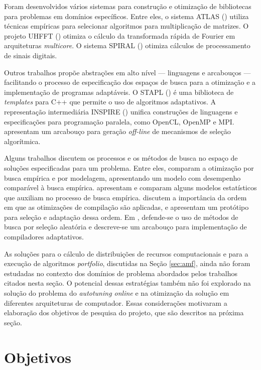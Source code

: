 \documentclass[a4paper, 11pt]{article}
\begin{document}
Foram desenvolvidos vários sistemas para construção e otimização de bibliotecas
para problemas em domínios específicos. Entre eles, o sistema ATLAS 
(\citet{whaley1998, whaley2005}) utiliza técnicas empíricas para selecionar
algoritmos para multiplicação de matrizes. O projeto UHFFT 
(\citet{ali2007scheduling}) otimiza o cálculo da transformada rápida
de Fourier em arquiteturas \emph{multicore}. O sistema SPIRAL 
(\citet{puschel2005spiral}) otimiza cálculos de processamento de sinais
digitais.

Outros trabalhos propõe abstrações em alto nível --- linguagens e arcabouços 
--- facilitando o processo de especificação dos espaços de busca para a 
otimização e a implementação de programas adaptáveis. O STAPL 
(\citet{thomas2005stapl}) é uma biblioteca de \emph{templates} para C++
que permite o uso de algoritmos adaptativos. A representação intermediária
INSPIRE (\citet{jordan2013inspire}) unifica construções de linguagens e 
especificações para programação paralela, como OpenCL, OpenMP e MPI.
\citet{yu2004adaptive} apresentam um arcabouço para geração \emph{off-line}
de mecanismos de seleção algorítmica.

Alguns trabalhos discutem os processos e os métodos de busca no espaço
de soluções especificadas para um problema. Entre eles,
\citet{yotov2003} comparam a otimização por busca empírica e por 
modelagem, apresentando um modelo com desempenho comparável à busca empírica.
\citet{vuduc2004} apresentam e comparam alguns
modelos estatísticos que auxiliam no processo de busca empírica.
\citet{cooper2002compilation} discutem a importância da
ordem em que as otimizações de compilação são aplicadas, e apresentam
um protótipo para seleção e adaptação dessa ordem.
Em \citet{cooper2002adaptive}, defende-se o uso de métodos de busca
por seleção aleatória e descreve-se um arcabouço para implementação
de compiladores adaptativos.

As soluções para o cálculo de distribuições de recursos computacionais e
para a execução de algoritmos \emph{portfolio}, discutidas na Seção 
\ref{sec:amf}, ainda não foram estudadas no contexto dos domínios de problema 
abordados pelos trabalhos citados nesta seção. 
O potencial dessas estratégias também não foi explorado na solução do 
problema do \emph{autotuning online} e na otimização da solução em diferentes
arquiteturas de computador. Essas considerações motivaram a elaboração dos
objetivos de pesquisa do projeto, que são descritos na próxima seção.

\section{Objetivos} \label{sec:obj}
\end{document}
